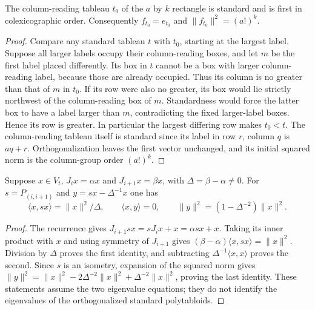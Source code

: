 \begin{lemma}
\label{lem:column-reading-initial}
\leanok
The column-reading tableau $t_0$ of the $a$ by $k$ rectangle is
standard and is first in colexicographic order. Consequently
$f_{t_0}=e_{t_0}$ and $\|f_{t_0}\|^2=(a!)^k$.
\end{lemma}
\begin{proof}
Compare any standard tableau $t$ with $t_0$, starting at the largest
label. Suppose all larger labels occupy their column-reading boxes,
and let $m$ be the first label placed differently. Its box in $t$
cannot be a box with larger column-reading label, because those are
already occupied. Thus its column is no greater than that of $m$
in $t_0$. If its row were also no greater, its box would lie strictly
northwest of the column-reading box of $m$. Standardness would force
the latter box to have a label larger than $m$, contradicting the
fixed larger-label boxes. Hence its row is greater. In particular
the largest differing row makes $t_0<t$. The column-reading tableau
itself is standard since its label in row $r$, column $q$ is $aq+r$.
Orthogonalization leaves the first vector unchanged, and its initial
squared norm is the column-group order $(a!)^k$.
\end{proof}

\begin{lemma}
\label{lem:murphy-eigenvector-residual}
\leanok
Suppose $x\in V_t$, $J_i x=\alpha x$ and
$J_{i+1}x=\beta x$, with $\Delta=\beta-\alpha\ne0$.
For $s=P_{(i,i+1)}$ and $y=sx-\Delta^{-1}x$ one has
\[
 \langle x,sx\rangle=\|x\|^2/\Delta,\qquad
 \langle x,y\rangle=0,\qquad
 \|y\|^2=(1-\Delta^{-2})\|x\|^2.
\]
\end{lemma}
\begin{proof}
The recurrence gives $J_{i+1}sx=sJ_ix+x=\alpha sx+x$.
Taking its inner product with $x$ and using symmetry of $J_{i+1}$
gives $(\beta-\alpha)\langle x,sx\rangle=\|x\|^2$.
Division by $\Delta$ proves the first identity, and subtracting
$\Delta^{-1}\langle x,x\rangle$ proves the second. Since $s$
is an isometry, expansion of the squared norm gives
$\|y\|^2=\|x\|^2-2\Delta^{-2}\|x\|^2+
\Delta^{-2}\|x\|^2$, proving the last identity.
These statements assume the two eigenvalue equations; they do not
identify the eigenvalues of the orthogonalized standard polytabloids.
\end{proof}

